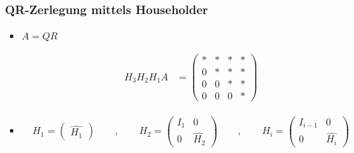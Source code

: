 \setcounter{page}{4}
\begin{frame}
\frametitle{QR-Zerlegung mittels Householder}

\begin{itemize}
	\item $ A = QR $
	
		\begin{align*}
		H_3 H_2 H_1 A &= \left( 
		\begin{array}{cccc}
		* & * & * & * \\ 
		0 & * & * & * \\ 
		0 & 0 & * & * \\ 
		0 & 0 & 0 & *
		\end{array}
		\right)
		\end{align*} 

	\item
	\begin{align*}
	H_1 = \begin{pmatrix}
	\hat{H_1} 
	\end{pmatrix} \qquad , \qquad
	H_2 = \left(\begin{array}{l|l}
	I_{1} & 0\\ \hline
	0 & \hat{H_2} 	
	\end{array} \right)\qquad , \qquad
	H_i = \left(\begin{array}{l|l}
	I_{i-1} & 0\\ \hline
	0 & \hat{H_i} 	
	\end{array} \right)
	\end{align*}
\end{itemize}
\end{frame}




